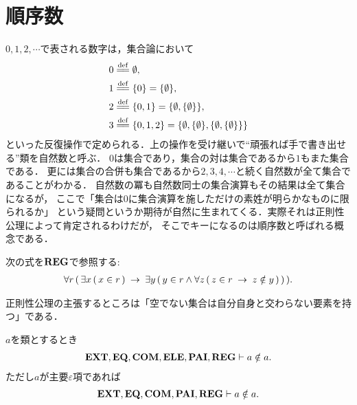 \section{順序数}
	$0,1,2,\cdots$で表される数字は，集合論において
	\begin{align}
		0 &\defeq \emptyset, \\
		1 &\defeq \{0\} = \{\emptyset\}, \\
		2 &\defeq \{0,1\} = \{\emptyset,\{\emptyset\}\}, \\
		3 &\defeq \{0,1,2\} = \{\emptyset,\{\emptyset\},\{\emptyset,\{\emptyset\}\}\}
	\end{align}
	といった反復操作で定められる．上の操作を受け継いで``頑張れば手で書き出せる''類を自然数と呼ぶ．
	$0$は集合であり，集合の対は集合であるから$1$もまた集合である．
	更には集合の合併も集合であるから$2,3,4,\cdots$と続く自然数が全て集合であることがわかる．
	自然数の冪も自然数同士の集合演算もその結果は全て集合になるが，
	ここで「集合は$0$に集合演算を施しただけの素姓が明らかなものに限られるか」
	という疑問というか期待が自然に生まれてくる．実際それは正則性公理によって肯定されるわけだが，
	そこでキーになるのは順序数と呼ばれる概念である．
	
	\begin{screen}
		\begin{axm}[正則性公理]
			次の式を$\mbox{{\bf REG}}$で参照する:
			\begin{align}
				\forall r\, (\, \exists x\, (\, x \in r\, )
				\hspace{0.25em}\rightarrow\hspace{0.25em} \exists y\, (\, y \in r \wedge \forall z\, 
				(\, z \in r \hspace{0.25em}\rightarrow\hspace{0.25em} z \notin y\, )\, )\, ).
			\end{align}
		\end{axm}
	\end{screen}
	
	正則性公理の主張するところは「空でない集合は自分自身と交わらない要素を持つ」である．
	
	\begin{screen}
		\begin{thm}[類は自分自身を要素に持たない]
		\label{thm:no_class_contains_itself}
			$a$を類とするとき
			\begin{align}
				\mbox{{\bf EXT}},\mbox{{\bf EQ}},\mbox{\bf COM},\mbox{{\bf ELE}},\mbox{{\bf PAI}},\mbox{{\bf REG}} \vdash a \notin a.
			\end{align}
			ただし$a$が主要$\varepsilon$項であれば
			\begin{align}
				\mbox{{\bf EXT}},\mbox{{\bf EQ}},\mbox{\bf COM},\mbox{{\bf PAI}},\mbox{{\bf REG}} \vdash a \notin a.
			\end{align}
		\end{thm}
	\end{screen}
	
